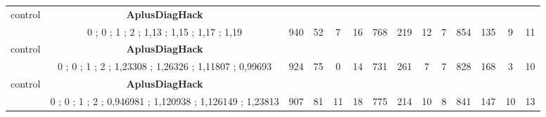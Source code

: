 \begin{table}[]
{\begin{tabular}{|c|c|c|c|c|c|c|c|c|c|c|c|c|c|}
control & \cellcolor{blue!15}\textbf{AplusDiagHack}& {\color[HTML]{00009B} } & {\color[HTML]{9A0000} } & {\color[HTML]{009901} } &  & {\color[HTML]{00009B} } & {\color[HTML]{9A0000} } & {\color[HTML]{009901} } &  & {\color[HTML]{00009B} } & {\color[HTML]{9A0000} } & {\color[HTML]{009901} } &  \\ 
 & \cellcolor{ blue!15}0 ; 0 ; 1 ; 2 ; 1,13 ; 1,15 ; 1,17 ; 1,19 & \multirow{-2}{*}{{\color[HTML]{00009B} 940}} & \multirow{-2}{*}{{\color[HTML]{9A0000} 52}} & \multirow{-2}{*}{{\color[HTML]{009901} 7}} & \multirow{-2}{*}{16} & \multirow{-2}{*}{{\color[HTML]{00009B} 768}} & \multirow{-2}{*}{{\color[HTML]{9A0000} 219}} & \multirow{-2}{*}{{\color[HTML]{009901} 12}} & \multirow{-2}{*}{7} & \multirow{-2}{*}{{\color[HTML]{00009B} 854}} & \multirow{-2}{*}{{\color[HTML]{9A0000} 135}} & \multirow{-2}{*}{{\color[HTML]{009901} 9}} & \multirow{-2}{*}{11} \\ \hline

control & \cellcolor{blue!15}\textbf{AplusDiagHack}& {\color[HTML]{00009B} } & {\color[HTML]{9A0000} } & {\color[HTML]{009901} } &  & {\color[HTML]{00009B} } & {\color[HTML]{9A0000} } & {\color[HTML]{009901} } &  & {\color[HTML]{00009B} } & {\color[HTML]{9A0000} } & {\color[HTML]{009901} } &  \\ 
 & \cellcolor{ blue!15}0 ; 0 ; 1 ; 2 ; 1,23308 ; 1,26326 ; 1,11807 ; 0,99693 & \multirow{-2}{*}{{\color[HTML]{00009B} 924}} & \multirow{-2}{*}{{\color[HTML]{9A0000} 75}} & \multirow{-2}{*}{{\color[HTML]{009901} 0}} & \multirow{-2}{*}{14} & \multirow{-2}{*}{{\color[HTML]{00009B} 731}} & \multirow{-2}{*}{{\color[HTML]{9A0000} 261}} & \multirow{-2}{*}{{\color[HTML]{009901} 7}} & \multirow{-2}{*}{7} & \multirow{-2}{*}{{\color[HTML]{00009B} 828}} & \multirow{-2}{*}{{\color[HTML]{9A0000} 168}} & \multirow{-2}{*}{{\color[HTML]{009901} 3}} & \multirow{-2}{*}{10} \\ \hline

control & \cellcolor{blue!15}\textbf{AplusDiagHack}& {\color[HTML]{00009B} } & {\color[HTML]{9A0000} } & {\color[HTML]{009901} } &  & {\color[HTML]{00009B} } & {\color[HTML]{9A0000} } & {\color[HTML]{009901} } &  & {\color[HTML]{00009B} } & {\color[HTML]{9A0000} } & {\color[HTML]{009901} } &  \\ 
 & \cellcolor{ blue!15}0 ; 0 ; 1 ; 2 ; 0,946981 ; 1,120938 ; 1,126149 ; 1,23813 & \multirow{-2}{*}{{\color[HTML]{00009B} 907}} & \multirow{-2}{*}{{\color[HTML]{9A0000} 81}} & \multirow{-2}{*}{{\color[HTML]{009901} 11}} & \multirow{-2}{*}{18} & \multirow{-2}{*}{{\color[HTML]{00009B} 775}} & \multirow{-2}{*}{{\color[HTML]{9A0000} 214}} & \multirow{-2}{*}{{\color[HTML]{009901} 10}} & \multirow{-2}{*}{8} & \multirow{-2}{*}{{\color[HTML]{00009B} 841}} & \multirow{-2}{*}{{\color[HTML]{9A0000} 147}} & \multirow{-2}{*}{{\color[HTML]{009901} 10}} & \multirow{-2}{*}{13} \\ \hline


\end{tabular}}
\end{table}
